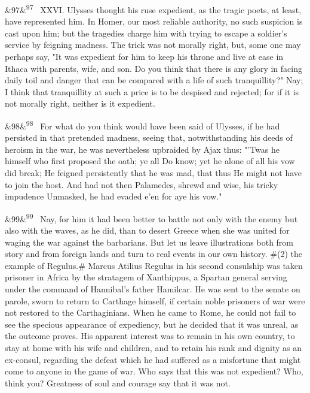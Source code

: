 \documentclass[12pt]{article}
\newcommand{\para}[1][]{\par\noindent\ifx&#1&\else\textsuperscript{\footnotesize #1}~\fi}
\begin{document}
\para[97] XXVI. Ulysses thought his ruse expedient, as the tragic poets, at least, have represented him. In Homer, our most reliable authority, no such suspicion is cast upon him; but the tragedies charge him with trying to escape a soldier's service by feigning madness. The trick was not morally right, but, some one may perhaps say, "It was expedient for him to keep his throne and live at ease in Ithaca with parents, wife, and son. Do you think that there is any glory in facing daily toil and danger that can be compared with a life of such tranquillity?" Nay; I think that tranquillity at such a price is to be despised and rejected; for if it is not morally right, neither is it expedient.

\para[98] For what do you think would have been said of Ulysses, if he had persisted in that pretended madness, seeing that, notwithstanding his deeds of heroism in the war, he was nevertheless upbraided by Ajax thus: "'Twas he himself who first proposed the oath; ye all Do know; yet he alone of all his vow did break; He feigned persistently that he was mad, that thus He might not have to join the host. And had not then Palamedes, shrewd and wise, his tricky impudence Unmasked, he had evaded e'en for aye his vow."

\para[99] Nay, for him it had been better to battle not only with the enemy but also with the waves, as he did, than to desert Greece when she was united for waging the war against the barbarians. But let us leave illustrations both from story and from foreign lands and turn to real events in our own history. \#(2) the example of Regulus.\# Marcus Atilius Regulus in his second consulship was taken prisoner in Africa by the stratagem of Xanthippus, a Spartan general serving under the command of Hannibal's father Hamilcar. He was sent to the senate on parole, sworn to return to Carthage himself, if certain noble prisoners of war were not restored to the Carthaginians. When he came to Rome, he could not fail to see the specious appearance of expediency, but he decided that it was unreal, as the outcome proves. His apparent interest was to remain in his own country, to stay at home with his wife and children, and to retain his rank and dignity as an ex-consul, regarding the defeat which he had suffered as a misfortune that might come to anyone in the game of war. Who says that this was not expedient? Who, think you? Greatness of soul and courage say that it was not.
\end{document}
